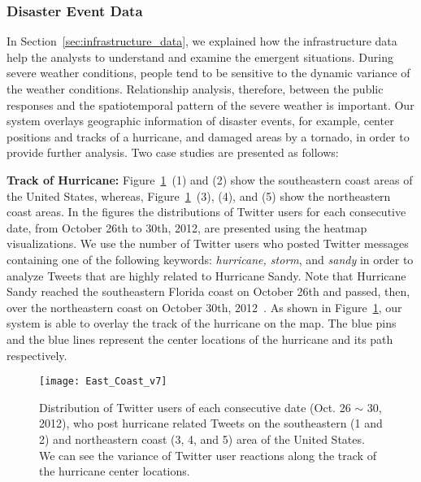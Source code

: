 \subsubsection{Disaster Event Data}
\label{sec:event_data}
%
In Section~\ref{sec:infrastructure_data}, we explained how the infrastructure data help the analysts to understand and examine the emergent situations.
During severe weather conditions, people tend to be sensitive to the dynamic variance of the weather conditions.
Relationship analysis, therefore, between the public responses and the spatiotemporal pattern of the severe weather is important.
Our system overlays geographic information of disaster events, for example, center positions and tracks of a hurricane, and damaged areas by a tornado, in order to provide further analysis.
Two case studies are presented as follows:

\textbf{Track of Hurricane:} Figure~\ref{fig:east_coast}~(1) and (2) show the southeastern coast areas of the United States, whereas,
Figure~\ref{fig:east_coast}~(3), (4), and (5) show the northeastern coast areas.
In the figures the distributions of Twitter users for each consecutive date, from October 26th to 30th, 2012, are presented 
using the heatmap visualizations.
We use the number of Twitter users who posted Twitter messages containing one of the following keywords: \textit{hurricane, storm}, and \textit{sandy} in order to analyze Tweets that are highly related to Hurricane Sandy.
Note that Hurricane Sandy reached the southeastern Florida coast on October 26th and passed, then, over the northeastern coast on October 30th, 2012~\cite{WKP:2012:SANDY}.
As shown in Figure~\ref{fig:east_coast}, our system is able to overlay the track of the hurricane on the map.
The blue pins and the blue lines represent the center locations of the hurricane and its path respectively.

\begin{figure}[tbh]
\centering
\texttt{[image: East\_Coast\_v7]}
\caption{Distribution of Twitter users of each consecutive date (Oct. 26 $\sim$ 30, 2012), who post hurricane related Tweets on the southeastern (1 and 2) and northeastern coast (3, 4, and 5) area of the United States. We can see the variance of Twitter user reactions along the track of the hurricane center locations.}
\label{fig:east_coast}
\end{figure}

